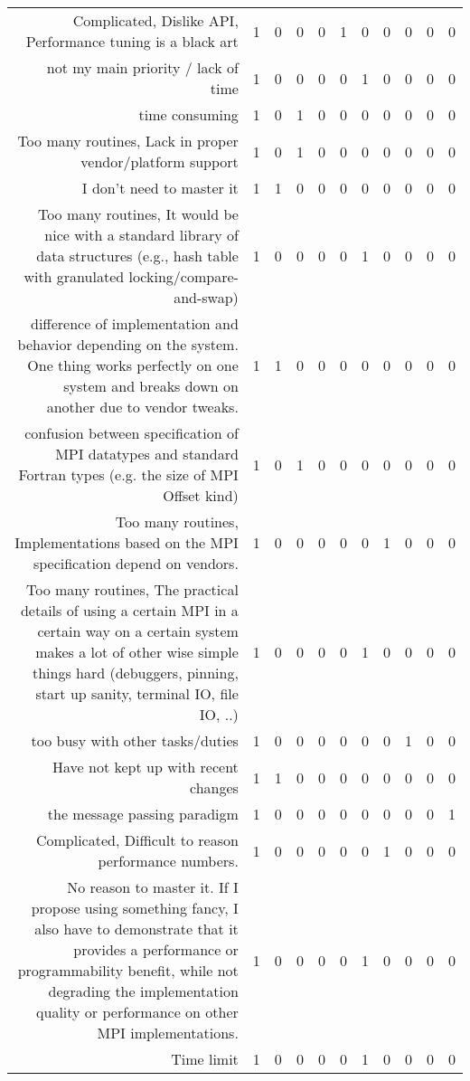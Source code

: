 {\begin{landscape}
\begin{longtable}[htb]{r|c|c|c|c|c|c|c|c|c|c}
{Complicated, Dislike API, Performance tuning is a black art} & 1 & 0 & 0 & 0 & 1 & 0 & 0 & 0 & 0 & 0 \\%
{not my main priority / lack of time} & 1 & 0 & 0 & 0 & 0 & 1 & 0 & 0 & 0 & 0 \\%
{time consuming} & 1 & 0 & 1 & 0 & 0 & 0 & 0 & 0 & 0 & 0 \\%
{Too many routines, Lack in proper vendor/platform support} & 1 & 0 & 1 & 0 & 0 & 0 & 0 & 0 & 0 & 0 \\%
{I don't need to master it} & 1 & 1 & 0 & 0 & 0 & 0 & 0 & 0 & 0 & 0 \\%
{Too many routines, It would be nice with a standard library of data structures (e.g., hash table with granulated locking/compare-and-swap)} & 1 & 0 & 0 & 0 & 0 & 1 & 0 & 0 & 0 & 0 \\%
{difference of implementation and behavior depending on the system. One thing works perfectly on one system and breaks down on another due to vendor tweaks.} & 1 & 1 & 0 & 0 & 0 & 0 & 0 & 0 & 0 & 0 \\%
{confusion between specification of MPI datatypes and standard Fortran types (e.g. the size of MPI Offset kind)} & 1 & 0 & 1 & 0 & 0 & 0 & 0 & 0 & 0 & 0 \\%
{Too many routines, Implementations based on the MPI specification depend on vendors.} & 1 & 0 & 0 & 0 & 0 & 0 & 1 & 0 & 0 & 0 \\%
{Too many routines, The practical details of using a certain MPI in a certain way on a certain system makes a lot of other wise simple things hard (debuggers, pinning, start up sanity, terminal IO, file IO, ..)} & 1 & 0 & 0 & 0 & 0 & 1 & 0 & 0 & 0 & 0 \\%
{too busy with other tasks/duties} & 1 & 0 & 0 & 0 & 0 & 0 & 0 & 1 & 0 & 0 \\%
{Have not kept up with recent changes} & 1 & 1 & 0 & 0 & 0 & 0 & 0 & 0 & 0 & 0 \\%
{the message passing paradigm} & 1 & 0 & 0 & 0 & 0 & 0 & 0 & 0 & 0 & 1 \\%
{Complicated, Difficult to reason performance numbers.} & 1 & 0 & 0 & 0 & 0 & 0 & 1 & 0 & 0 & 0 \\%
{No reason to master it. If I propose using something fancy, I also have to demonstrate that it provides a performance or programmability benefit, while not degrading the implementation quality or performance on other MPI implementations.} & 1 & 0 & 0 & 0 & 0 & 1 & 0 & 0 & 0 & 0 \\%
{Time limit} & 1 & 0 & 0 & 0 & 0 & 1 & 0 & 0 & 0 & 0 \\%

\end{longtable}
\end{landscape}}
